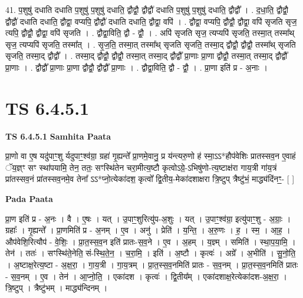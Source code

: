 \documentclass[17pt]{extarticle}
\begin{document}
41. प॒शुषु॑ दधाति दधाति प॒शुषु॑ प॒शुषु॑ दधाति॒ द्वौद्वौ॒ द्वौद्वौ॑ दधाति प॒शुषु॑ प॒शुषु॑ दधाति॒ द्वौद्वौ᳚ । . द॒धा॒ति॒ द्वौद्वौ॒ द्वौद्वौ॑ दधाति दधाति॒ द्वौद्वा॒ वप्यपि॒ द्वौद्वौ॑ दधाति दधाति॒ द्वौद्वा॒ वपि॑ । . द्वौद्वा॒ वप्यपि॒ द्वौद्वौ॒ द्वौद्वा॒ वपि॑ सृजति सृज॒ त्यपि॒ द्वौद्वौ॒ द्वौद्वा॒ वपि॑ सृजति । . द्वौद्वा॒विति॒ द्वौ - द्वौ॒ । . अपि॑ सृजति सृज॒ त्यप्यपि॑ सृजति॒ तस्मा॒त् तस्मा᳚थ् सृज॒ त्यप्यपि॑ सृजति॒ तस्मा᳚त् । . सृ॒ज॒ति॒ तस्मा॒त् तस्मा᳚थ् सृजति सृजति॒ तस्मा॒द् द्वौद्वौ॒ द्वौद्वौ॒ तस्मा᳚थ् सृजति सृजति॒ तस्मा॒द् द्वौद्वौ᳚ । . तस्मा॒द् द्वौद्वौ॒ द्वौद्वौ॒ तस्मा॒त् तस्मा॒द् द्वौद्वौ᳚ प्रा॒णाः प्रा॒णा द्वौद्वौ॒ तस्मा॒त् तस्मा॒द् द्वौद्वौ᳚ प्रा॒णाः । . द्वौद्वौ᳚ प्रा॒णाः प्रा॒णा द्वौद्वौ॒ द्वौद्वौ᳚ प्रा॒णाः । . द्वौद्वा॒विति॒ द्वौ - द्वौ॒ । . प्रा॒णा इति॑ प्र - अ॒नाः । \newline
\pagebreak
{}

\section{ TS 6.4.5.1 }

\textbf{TS 6.4.5.1 } \newline
\textbf{Samhita Paata} \newline

प्रा॒णो वा ए॒ष यदु॑पाꣳ॒॒शु र्यदुपाꣳ॒॒श्व॑ग्रा॒ ग्रहा॑ गृ॒ह्यन्ते᳚ प्रा॒णमे॒वानु॒ प्र य॑न्त्यरु॒णो ह॑ स्मा॒ऽऽ*हौप॑वेशिः प्रातस्सव॒न ए॒वाहं ॅय॒ज्ञ्ꣳ सꣳ स्था॑पयामि॒ तेन॒ ततः॒ सꣳस्थि॑तेन चरा॒मीत्य॒ष्टौ कृत्वोऽग्रे॒-ऽभिषु॑णो-त्य॒ष्टाक्ष॑रा गाय॒त्री गा॑य॒त्रं प्रा॑तस्सव॒नं प्रा॑तस्सव॒नमे॒व तेना᳚ ऽऽ*प्नो॒त्येका॑दश॒ कृत्वो᳚ द्वि॒तीय॒-मेका॑दशाक्षरा त्रि॒ष्टुप् त्रैष्टु॑भं॒ माद्ध्य॑दिंनꣳ॒॒- [  ] \newline

\textbf{Pada Paata} \newline

प्रा॒ण इति॑ प्र - अ॒नः । वै । ए॒षः । यत् । उ॒पाꣳ॒॒शुरित्यु॑प-अ॒शुः । यत् । उ॒पाꣳ॒॒श्व॑ग्रा॒ इत्यु॑पाꣳ॒॒शु - अ॒ग्राः॒ । ग्रहाः᳚ । गृ॒ह्यन्ते᳚ । प्रा॒णमिति॑ प्र - अ॒नम् । ए॒व । अनु॑ । प्रेति॑ । य॒न्ति॒ । अ॒रु॒णः । ह॒ । स्म॒ । आ॒ह॒ । औप॑वेशि॒रित्यौप॑ - वे॒शिः॒ । प्रा॒त॒स्स॒व॒न इति॑ प्रातः-स॒व॒ने । ए॒व । अ॒हम् । य॒ज्ञ्म् । समिति॑ । स्था॒प॒या॒मि॒ । तेन॑ । ततः॑ । सꣳस्थि॑ते॒नेति॒ सं-स्थि॒ते॒न॒ । च॒रा॒मि॒ । इति॑ । अ॒ष्टौ । कृत्वः॑ । अग्रे᳚ । अ॒भीति॑ । सु॒नो॒ति॒ । अ॒ष्टाक्ष॒रेत्य॒ष्टा - अ॒क्ष॒रा॒ । गा॒य॒त्री । गा॒य॒त्रम् । प्रा॒त॒स्स॒व॒नमिति॑ प्रातः - स॒व॒नम् । प्रा॒त॒स्स॒व॒नमिति॑ प्रातः - स॒व॒नम् । ए॒व । तेन॑ । आ॒प्नो॒ति॒ । एका॑दश । कृत्वः॑ । द्वि॒तीय᳚म् । एका॑दशाक्ष॒रेत्येका॑दश-अ॒क्ष॒रा॒ । त्रि॒ष्टुप् । त्रैष्टु॑भम् । माद्ध्य॑न्दिनम् ।  \newline
\end{document}
